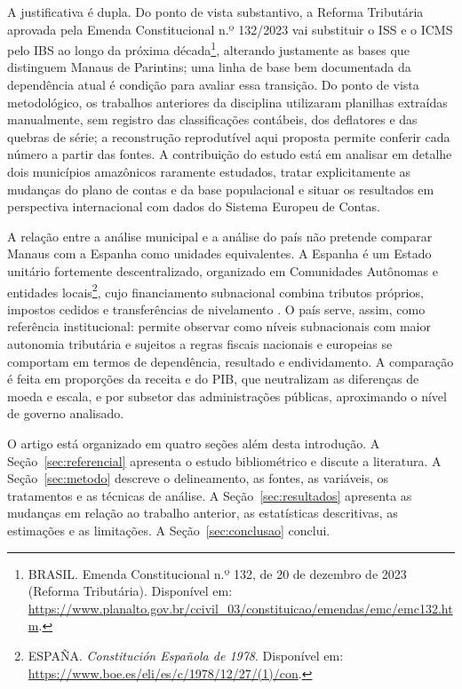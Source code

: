A justificativa é dupla. Do ponto de vista substantivo, a Reforma Tributária aprovada pela Emenda Constitucional n.º 132/2023 vai substituir o ISS e o ICMS pelo IBS ao longo da próxima década\footnote{BRASIL. Emenda Constitucional n.º 132, de 20 de dezembro de 2023 (Reforma Tributária). Disponível em: \url{https://www.planalto.gov.br/ccivil_03/constituicao/emendas/emc/emc132.htm}.}, alterando justamente as bases que distinguem Manaus de Parintins; uma linha de base bem documentada da dependência atual é condição para avaliar essa transição. Do ponto de vista metodológico, os trabalhos anteriores da disciplina utilizaram planilhas extraídas manualmente, sem registro das classificações contábeis, dos deflatores e das quebras de série; a reconstrução reprodutível aqui proposta permite conferir cada número a partir das fontes. A contribuição do estudo está em analisar em detalhe dois municípios amazônicos raramente estudados, tratar explicitamente as mudanças do plano de contas e da base populacional e situar os resultados em perspectiva internacional com dados do Sistema Europeu de Contas.

A relação entre a análise municipal e a análise do país não pretende comparar Manaus com a Espanha como unidades equivalentes. A Espanha é um Estado unitário fortemente descentralizado, organizado em Comunidades Autônomas e entidades locais\footnote{ESPAÑA. \textit{Constitución Española de 1978}. Disponível em: \url{https://www.boe.es/eli/es/c/1978/12/27/(1)/con}.}, cujo financiamento subnacional combina tributos próprios, impostos cedidos e transferências de nivelamento \cite{zabalza2011,toboso2010}. O país serve, assim, como referência institucional: permite observar como níveis subnacionais com maior autonomia tributária e sujeitos a regras fiscais nacionais e europeias se comportam em termos de dependência, resultado e endividamento. A comparação é feita em proporções da receita e do PIB, que neutralizam as diferenças de moeda e escala, e por subsetor das administrações públicas, aproximando o nível de governo analisado.

O artigo está organizado em quatro seções além desta introdução. A Seção~\ref{sec:referencial} apresenta o estudo bibliométrico e discute a literatura. A Seção~\ref{sec:metodo} descreve o delineamento, as fontes, as variáveis, os tratamentos e as técnicas de análise. A Seção~\ref{sec:resultados} apresenta as mudanças em relação ao trabalho anterior, as estatísticas descritivas, as estimações e as limitações. A Seção~\ref{sec:conclusao} conclui.
